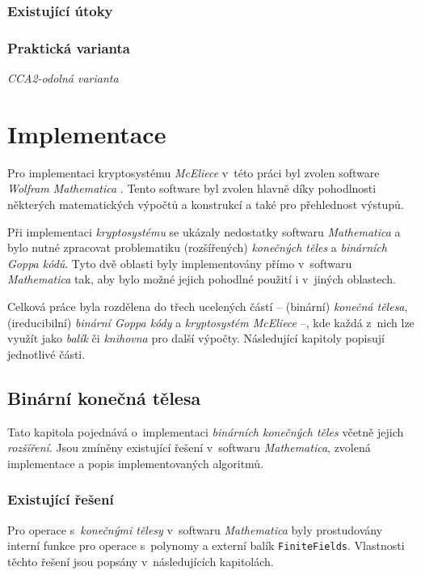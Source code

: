 \documentclass[thesis=M,czech,hidelinks]{FITthesis}[2012/06/26]
\begin{document}
\subsection{Existující útoky}
\subsection{Praktická varianta}
\emph{CCA2-odolná varianta}





\chapter{Implementace}\label{kap_implementace}
Pro implementaci kryptosystému \emph{McEliece} v~této práci byl zvolen software
\emph{Wolfram Mathematica} \cite{Mathematica}. Tento software byl zvolen hlavně
díky pohodlnosti některých matematických výpočtů a konstrukcí a také pro
přehlednost výstupů. %

Při implementaci \emph{kryptosystému} se ukázaly nedostatky softwaru
\emph{Mathematica} a bylo nutné zpracovat problematiku (rozšířených)
\emph{konečných těles} a \emph{binárních Goppa kódů}. Tyto dvě oblasti byly
implementovány přímo v~softwaru \emph{Mathematica} tak, aby bylo možné jejich
pohodlné použití i v~jiných oblastech.

Celková práce byla rozdělena do třech ucelených částí -- (binární) \emph{konečná
tělesa}, (ireducibilní) \emph{binární Goppa kódy} a \emph{kryptosystém
McEliece} --, kde každá z~nich lze využít jako \emph{balík} či \emph{knihovna}
pro další výpočty. Následující kapitoly popisují jednotlivé části.


\section{Binární konečná tělesa}
Tato kapitola pojednává o~implementaci \emph{binárních konečných těles} včetně
jejich \emph{rozšíření}. Jsou zmíněny existující řešení v~softwaru
\emph{Mathematica}, zvolená implementace a popis implementovaných algoritmů.

\subsection{Existující řešení}
Pro operace s~\emph{konečnými tělesy} v~softwaru \emph{Mathematica} byly
prostudovány interní funkce pro operace s~polynomy a externí balík
\texttt{FiniteFields}. Vlastnosti těchto řešení jsou popsány v~následujících
kapitolách.
\end{document}
